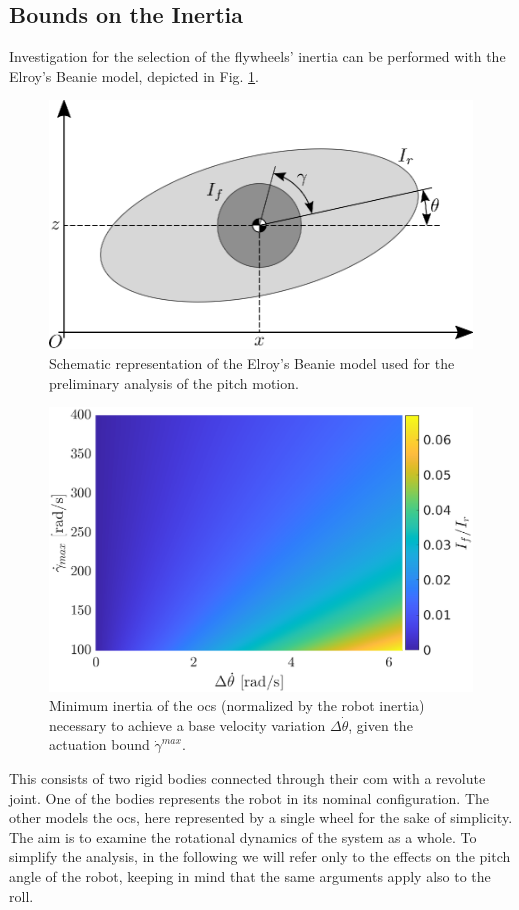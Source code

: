 \documentclass[sensors,article,submit,pdftex,moreauthors]{Definitions/mdpi}
\begin{document}
\subsection{Bounds on the Inertia}
Investigation for the selection of the flywheels' inertia can be performed with the Elroy's Beanie model, depicted in Fig. \ref{fig:elroy-beanie}.
\begin{figure}
	\centering
	\includegraphics[width=.7\linewidth]{figures/elroys-beanie.eps}
	\caption{\small Schematic representation of the Elroy's Beanie model used for the preliminary analysis of the pitch motion.}
	\label{fig:elroy-beanie}
\end{figure} 
\begin{figure}
	\centering
	\includegraphics[width=.8\linewidth]{figures/lowerbound2.eps}
	\caption{\small Minimum inertia of the \gls{ocs} (normalized by the robot inertia) necessary to achieve a base velocity variation $\Delta \dot{\theta}$, given the actuation bound $\dot \gamma^{max}$.}
	\label{fig:inertia_limits}
\end{figure}
This consists of two rigid bodies connected through their \gls{com} with a revolute joint. One of the bodies represents the robot in its nominal configuration. The other models the \gls{ocs}, here represented by a single wheel for the sake of simplicity. The aim is to examine the rotational dynamics of the system as a whole. To simplify the analysis, in the following we will refer only to the effects on the pitch angle of the robot, keeping in mind that the same arguments apply also to the roll. 
\end{document}
